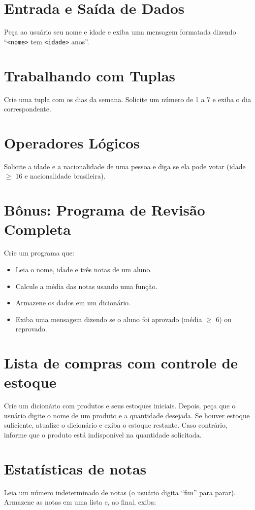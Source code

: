 \section{Entrada e Saída de Dados}
Peça ao usuário seu nome e idade e exiba uma mensagem formatada dizendo “\texttt{<nome>} tem \texttt{<idade>} anos”.

\section{Trabalhando com Tuplas}
Crie uma tupla com os dias da semana. Solicite um número de 1 a 7 e exiba o dia correspondente.

\section{Operadores Lógicos}
Solicite a idade e a nacionalidade de uma pessoa e diga se ela pode votar (idade $\geq$ 16 e nacionalidade brasileira).


\section{\textbf{Bônus: Programa de Revisão Completa}}
Crie um programa que:
\begin{itemize}
\item Leia o nome, idade e três notas de um aluno.
\item Calcule a média das notas usando uma função.
\item Armazene os dados em um dicionário.
\item Exiba uma mensagem dizendo se o aluno foi aprovado (média $\geq$ 6) ou reprovado.
\end{itemize}



\section{Lista de compras com controle de estoque}

Crie um dicionário com produtos e seus estoques iniciais. Depois, peça que o usuário digite o nome de um produto e a quantidade desejada.
Se houver estoque suficiente, atualize o dicionário e exiba o estoque restante.
Caso contrário, informe que o produto está indisponível na quantidade solicitada.


\section{Estatísticas de notas}
Leia um número indeterminado de notas (o usuário digita “fim” para parar). Armazene as notas em uma lista e, ao final, exiba:

